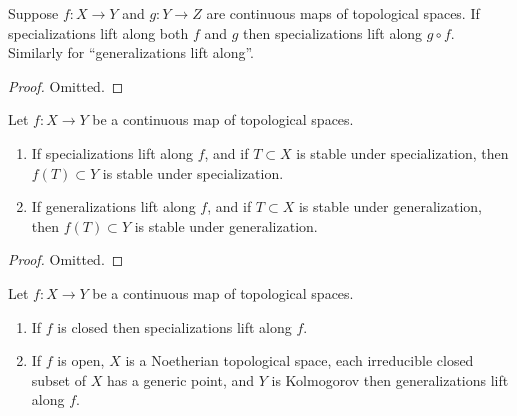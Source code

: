 \begin{lemma}
\label{lemma-lift-specialization-composition}
Suppose $f : X \to Y$ and $g : Y \to Z$ are continuous maps
of topological spaces. If specializations lift along both $f$ and $g$
then specializations lift along $g \circ f$. Similarly for
``generalizations lift along''.
\end{lemma}

\begin{proof}
Omitted.
\end{proof}

\begin{lemma}
\label{lemma-lift-specializations-images}
Let $f : X \to Y$ be a continuous map of topological spaces.
\begin{enumerate}
\item If specializations lift along $f$, and if $T \subset X$
is stable under specialization, then $f(T) \subset Y$ is
stable under specialization.
\item If generalizations lift along $f$, and if $T \subset X$
is stable under generalization, then $f(T) \subset Y$ is
stable under generalization.
\end{enumerate}
\end{lemma}

\begin{proof}
Omitted.
\end{proof}

\begin{lemma}
\label{lemma-closed-open-map-specialization}
Let $f : X \to Y$ be a continuous map of topological spaces.
\begin{enumerate}
\item If $f$ is closed then specializations lift along $f$.
\item If $f$ is open, $X$ is a Noetherian topological space,
each irreducible closed subset of $X$ has a generic point,
and $Y$ is Kolmogorov then generalizations lift along $f$.
\end{enumerate}
\end{lemma}

